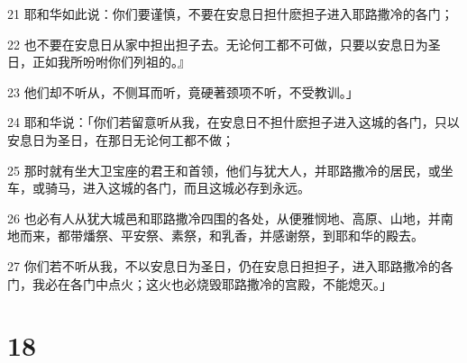 \par 21 耶和华如此说：你们要谨慎，不要在安息日担什麽担子进入耶路撒冷的各门；
\par 22 也不要在安息日从家中担出担子去。无论何工都不可做，只要以安息日为圣日，正如我所吩咐你们列祖的。』
\par 23 他们却不听从，不侧耳而听，竟硬著颈项不听，不受教训。」
\par 24 耶和华说：「你们若留意听从我，在安息日不担什麽担子进入这城的各门，只以安息日为圣日，在那日无论何工都不做；
\par 25 那时就有坐大卫宝座的君王和首领，他们与犹大人，并耶路撒冷的居民，或坐车，或骑马，进入这城的各门，而且这城必存到永远。
\par 26 也必有人从犹大城邑和耶路撒冷四围的各处，从便雅悯地、高原、山地，并南地而来，都带燔祭、平安祭、素祭，和乳香，并感谢祭，到耶和华的殿去。
\par 27 你们若不听从我，不以安息日为圣日，仍在安息日担担子，进入耶路撒冷的各门，我必在各门中点火；这火也必烧毁耶路撒冷的宫殿，不能熄灭。」

\chapter{18}

